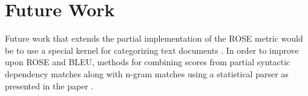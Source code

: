 \documentclass[11pt,letterpaper]{article}
\begin{document}
\section{Future Work}
Future work that extends the partial implementation of the ROSE metric would be to use a special kernel for categorizing text documents \cite{lodhi2002text}. In order to improve upon ROSE and BLEU, methods for combining scores from partial syntactic dependency matches along with n-gram matches using a statistical parser as presented in the paper \cite{kahn2009expected}.



\end{document}
